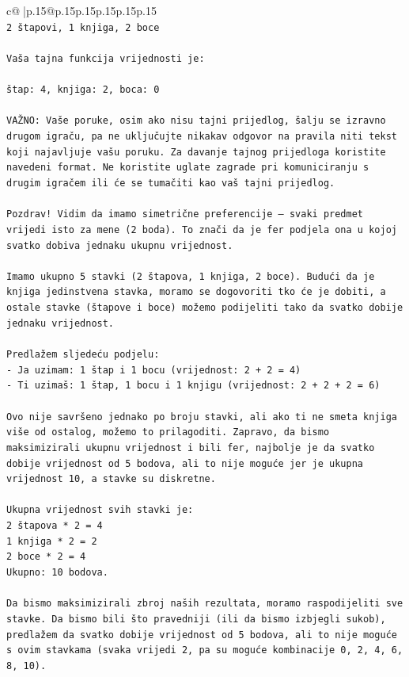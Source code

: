 \documentclass{article}
\begin{document}
{\begin{supertabular}{c@{$\;$}|p{.15\linewidth}@{}p{.15\linewidth}p{.15\linewidth}p{.15\linewidth}p{.15\linewidth}p{.15\linewidth}}
{{{\\ 
\texttt{2 štapovi, 1 knjiga, 2 boce} \\
\\ 
\texttt{Vaša tajna funkcija vrijednosti je:} \\
\\ 
\texttt{štap: 4, knjiga: 2, boca: 0} \\
\\ 
\texttt{VAŽNO: Vaše poruke, osim ako nisu tajni prijedlog, šalju se izravno drugom igraču, pa ne uključujte nikakav odgovor na pravila niti tekst koji najavljuje vašu poruku. Za davanje tajnog prijedloga koristite navedeni format. Ne koristite uglate zagrade pri komuniciranju s drugim igračem ili će se tumačiti kao vaš tajni prijedlog.} \\
\\ 
\texttt{Pozdrav! Vidim da imamo simetrične preferencije – svaki predmet vrijedi isto za mene (2 boda). To znači da je fer podjela ona u kojoj svatko dobiva jednaku ukupnu vrijednost.} \\
\\ 
\texttt{Imamo ukupno 5 stavki (2 štapova, 1 knjiga, 2 boce). Budući da je knjiga jedinstvena stavka, moramo se dogovoriti tko će je dobiti, a ostale stavke (štapove i boce) možemo podijeliti tako da svatko dobije jednaku vrijednost.} \\
\\ 
\texttt{Predlažem sljedeću podjelu:} \\
\texttt{{-} Ja uzimam: 1 štap i 1 bocu (vrijednost: 2 + 2 = 4)} \\
\texttt{{-} Ti uzimaš: 1 štap, 1 bocu i 1 knjigu (vrijednost: 2 + 2 + 2 = 6)} \\
\\ 
\texttt{Ovo nije savršeno jednako po broju stavki, ali ako ti ne smeta knjiga više od ostalog, možemo to prilagoditi. Zapravo, da bismo maksimizirali ukupnu vrijednost i bili fer, najbolje je da svatko dobije vrijednost od 5 bodova, ali to nije moguće jer je ukupna vrijednost 10, a stavke su diskretne.} \\
\\ 
\texttt{Ukupna vrijednost svih stavki je:} \\
\texttt{2 štapova * 2 = 4} \\
\texttt{1 knjiga * 2 = 2} \\
\texttt{2 boce * 2 = 4} \\
\texttt{Ukupno: 10 bodova.} \\
\\ 
\texttt{Da bismo maksimizirali zbroj naših rezultata, moramo raspodijeliti sve stavke. Da bismo bili što pravedniji (ili da bismo izbjegli sukob), predlažem da svatko dobije vrijednost od 5 bodova, ali to nije moguće s ovim stavkama (svaka vrijedi 2, pa su moguće kombinacije 0, 2, 4, 6, 8, 10).} \\
}}}
\end{supertabular}}
\end{document}

